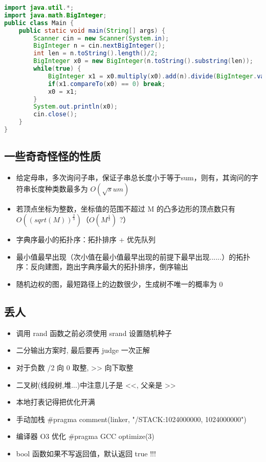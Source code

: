 \begin{lstlisting}[language=java]
import java.util.*;
import java.math.BigInteger;
public class Main {
    public static void main(String[] args) {
        Scanner cin = new Scanner(System.in);
        BigInteger n = cin.nextBigInteger();
        int len = n.toString().length()/2;
        BigInteger x0 = new BigInteger(n.toString().substring(len));
        while(true) {
            BigInteger x1 = x0.multiply(x0).add(n).divide(BigInteger.valueOf(2).multiply(x0));
            if(x1.compareTo(x0) == 0) break;
            x0 = x1;
        }
        System.out.println(x0);
        cin.close();
    }
}
\end{lstlisting}


\subsection{一些奇奇怪怪的性质}

\begin{itemize}
    \item 给定母串，多次询问子串，保证子串总长度小于等于sum，则有，其询问的字符串长度种类数最多为 $O(\sqrt sum)$
    \item 若顶点坐标为整数，坐标值的范围不超过 M 的凸多边形的顶点数只有 $O((sqrt(M))^\frac{2}{3}) （O(M^\frac{1}{3})$ ?）
    \item 字典序最小的拓扑序：拓扑排序 + 优先队列
    \item 最小值最早出现（次小值在最小值最早出现的前提下最早出现......）的拓扑序：反向建图，跑出字典序最大的拓扑排序，倒序输出
    \item 随机边权的图，最短路径上的边数很少，生成树不唯一的概率为 0
\end{itemize}

\subsection{丢人}

\begin{itemize}
    \item 调用 rand 函数之前必须使用 srand 设置随机种子
    \item 二分输出方案时, 最后要再 judge 一次正解
    \item 对于负数 /2 向 0 取整, >> 向下取整
    \item 二叉树(线段树,堆...)中注意儿子是 <<, 父亲是 >>
    \item 本地打表记得把优化开满
    \item 手动加栈 \#pragma comment(linker, "/STACK:1024000000, 1024000000")
    \item 编译器 O3 优化 \#pragma GCC optimize(3)
    \item bool 函数如果不写返回值，默认返回 true !!!
\end{itemize}